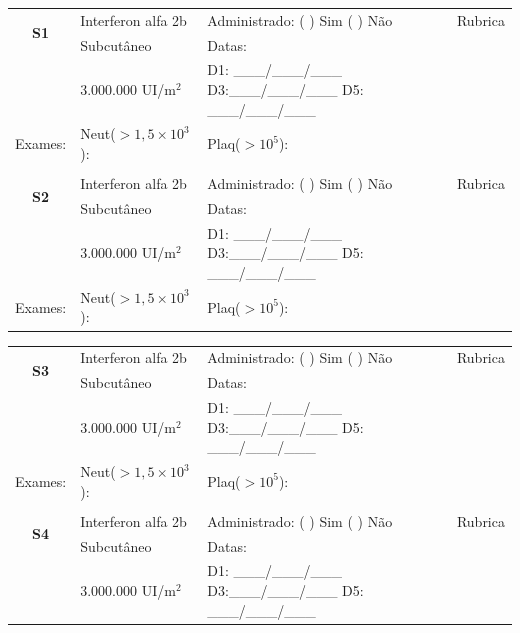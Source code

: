 \documentclass[11pt,a4paper,oldfontcommands]{memoir}
\begin{document}
\begin{center}
\begin{table}[H]
\begin{tabular}{p{1.4cm}p{3.5cm}|p{8cm}|p{1.2cm}}
    \hline
    \multicolumn{1}{c|}{\multirow{2}{*}{\textbf{S1}}}&{Interferon alfa 2b}&{Administrado: (  ) Sim (  ) Não}&{Rubrica}\\
    \multicolumn{1}{c|}{}&{Subcutâneo}&{Datas:}&\\
    \multicolumn{1}{c|}{}&{3.000.000 UI/m\(^2\)}&{D1: \_\_\_/\_\_\_/\_\_\_ D3:\_\_\_/\_\_\_/\_\_\_ D5: \_\_\_/\_\_\_/\_\_\_}&\\
    \hline
    {Exames:}&{Neut(\(>1,5\times10^3\)):}&{Plaq(\(>10^5\)):}&{}
    \\
    \hline
    \\
    \hline
    \multicolumn{1}{c|}{\multirow{2}{*}{\textbf{S2}}}&{Interferon alfa 2b}&{Administrado: (  ) Sim (  ) Não}&{Rubrica}\\
    \multicolumn{1}{c|}{}&{Subcutâneo}&{Datas:}&\\
    \multicolumn{1}{c|}{}&{3.000.000 UI/m\(^2\)}&{D1: \_\_\_/\_\_\_/\_\_\_ D3:\_\_\_/\_\_\_/\_\_\_ D5: \_\_\_/\_\_\_/\_\_\_}&\\
    \hline
    {Exames:}&{Neut(\(>1,5\times10^3\)):}&{Plaq(\(>10^5\)):}&{}
    \\
    \hline
\end{tabular}
\end{table}
\begin{table}[H]
\begin{tabular}{p{1.4cm}p{3.5cm}|p{8cm}|p{1.2cm}}
    \hline
    \multicolumn{1}{c|}{\multirow{2}{*}{\textbf{S3}}}&{Interferon alfa 2b}&{Administrado: (  ) Sim (  ) Não}&{Rubrica}\\
    \multicolumn{1}{c|}{}&{Subcutâneo}&{Datas:}&\\
    \multicolumn{1}{c|}{}&{3.000.000 UI/m\(^2\)}&{D1: \_\_\_/\_\_\_/\_\_\_ D3:\_\_\_/\_\_\_/\_\_\_ D5: \_\_\_/\_\_\_/\_\_\_}&\\
    \hline
    {Exames:}&{Neut(\(>1,5\times10^3\)):}&{Plaq(\(>10^5\)):}&{}
    \\
    \hline
    \\
    \hline
    \multicolumn{1}{c|}{\multirow{2}{*}{\textbf{S4}}}&{Interferon alfa 2b}&{Administrado: (  ) Sim (  ) Não}&{Rubrica}\\
    \multicolumn{1}{c|}{}&{Subcutâneo}&{Datas:}&\\
    \multicolumn{1}{c|}{}&{3.000.000 UI/m\(^2\)}&{D1: \_\_\_/\_\_\_/\_\_\_ D3:\_\_\_/\_\_\_/\_\_\_ D5: \_\_\_/\_\_\_/\_\_\_}&\\

\end{tabular}
\end{table}
\end{center}
\end{document}
